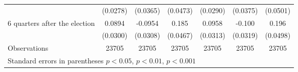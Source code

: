 \begin{table}[!ht]
\begin{tabular}{l*{6}{c}}
                    &    (0.0278)         &    (0.0365)         &    (0.0473)         &    (0.0290)         &    (0.0375)         &    (0.0501)         \\
[0.5em]
 6 quarters after the election&      0.0894\sym{**} &     -0.0954\sym{**} &       0.185\sym{***}&      0.0958\sym{**} &      -0.100\sym{**} &       0.196\sym{***}\\
                    &    (0.0300)         &    (0.0308)         &    (0.0467)         &    (0.0313)         &    (0.0319)         &    (0.0498)         \\
\hline
Observations        &       23705         &       23705         &       23705         &       23705         &       23705         &       23705         \\
\hline\hline
\multicolumn{7}{l}{ Standard errors in parentheses \sym{*} \(p<0.05\), \sym{**} \(p<0.01\), \sym{***} \(p<0.001\)}\\
\end{tabular}
\end{table}

